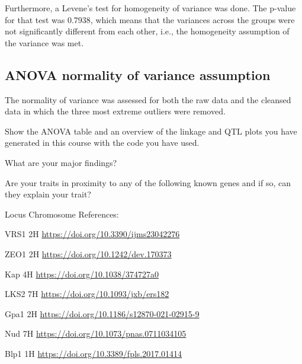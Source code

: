 Furthermore, a Levene's test for homogeneity of variance was done. The p-value for that test was \num{0.7938}, which means that the variances across the groups were not significantly different from each other, i.e., the homogeneity assumption of the variance was met.

\subsection{ANOVA normality of variance assumption}

The normality of variance was assessed for both the raw data and the cleansed data in which the three most extreme outliers were removed.






Show the ANOVA table and an overview of the linkage and QTL plots you have generated in this course with the code you have used.

What are your major findings?

Are your traits in proximity to any of the following known genes and if so, can they explain your trait?

Locus Chromosome References:

VRS1 2H \url{https://doi.org/10.3390/ijms23042276}

ZEO1 2H \url{https://doi.org/10.1242/dev.170373}

Kap 4H \url{https://doi.org/10.1038/374727a0}

LKS2 7H \url{https://doi.org/10.1093/jxb/ers182}

Gpa1 2H \url{https://doi.org/10.1186/s12870-021-02915-9}

Nud 7H \url{https://doi.org/10.1073/pnas.0711034105}

Blp1 1H \url{https://doi.org/10.3389/fpls.2017.01414}
